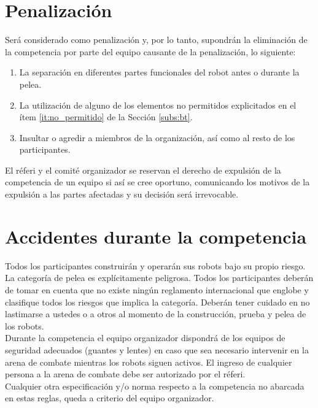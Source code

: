 \documentclass[11pt]{article}
\begin{document}
\section{Penalización}
Será considerado como penalización y, por lo tanto, supondrán la eliminación de la competencia por parte del equipo causante de la penalización, lo siguiente: %
\begin{enumerate}
    \item La separación en diferentes partes funcionales del robot antes o durante la pelea.
    \item La utilización de alguno de los elementos no permitidos explicitados en el ítem \ref{it:no_permitido} de la Sección \ref{subs:bt}. 
    \item Insultar o agredir a miembros de la organización, así como al resto de los participantes.
\end{enumerate}

El réferi y el comité organizador se reservan el derecho de expulsión de la competencia de un equipo si así se cree oportuno, comunicando los motivos de la expulsión a las partes afectadas y su decisión será irrevocable.

\section{Accidentes durante la competencia} 
Todos los participantes construirán y operarán sus robots bajo su propio riesgo. La categoría de pelea es explícitamente peligrosa. Todos los participantes deberán de tomar en cuenta que no existe ningún reglamento internacional que englobe y clasifique todos los riesgos que implica la categoría. Deberán tener cuidado en no lastimarse a ustedes o a otros al momento de la construcción, prueba y pelea de los robots.\\

Durante la competencia el equipo organizador dispondrá de los equipos de seguridad adecuados (guantes y lentes) en caso que sea necesario intervenir en la arena de combate mientras los robots siguen activos. El ingreso de cualquier persona a la arena de combate debe ser autorizado por el réferi. \\

\vspace{15mm}
Cualquier otra especificación y/o norma respecto a la competencia no abarcada en estas reglas, queda a criterio del equipo organizador. \\
\end{document}
